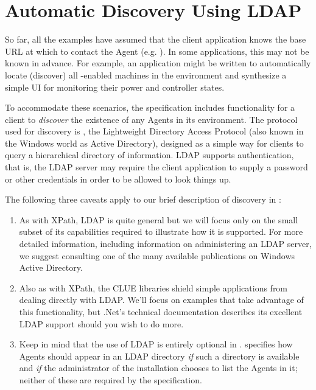 
\section{Automatic Discovery Using LDAP}
\label{sec:discovery}

So far, all the examples have assumed that the client application knows
the base URL at which to contact the Agent
(e.g. ).
In some applications, this may not be known in advance.  For example, an
application might be written to automatically locate (discover) all
\mtc-enabled machines in the environment and synthesize a simple UI for
monitoring their power and controller states.

To accommodate these scenarios, the \mtc{} specification includes
functionality for a client to \emph{discover} the existence of any
Agents in its environment.  The protocol used for discovery is
, the Lightweight Directory Access Protocol (also known in
the Windows world as Active Directory), designed as a simple way for
clients to query a hierarchical directory of information.  LDAP supports
authentication, that is, the LDAP server may require the client
application to supply a password or other credentials in order to be
allowed to look things up.

The following three caveats apply to our brief description of discovery
in \mtc:

\begin{enumerate}

\item 
As with XPath, LDAP is quite general but we will focus only on the small
subset of its capabilities required to illustrate how it \mtc{} is
supported.  For more detailed information, including information on
administering an LDAP server, we suggest consulting one of the many
available publications on Windows Active Directory.

\item Also as with XPath, the CLUE libraries
shield simple applications from dealing directly with LDAP.
We'll focus on examples that take advantage of this functionality, but
.Net's technical documentation describes its excellent LDAP support
should you wish to do more.

\item Keep in mind that the use of LDAP is entirely optional in \mtc{}.
  \mtc{} specifies how Agents should appear in an LDAP directory
  \emph{if} such a directory is available and \emph{if} the
  administrator of the installation chooses to list the Agents  in it;
  neither  of these are required by the specification.
\end{enumerate}


